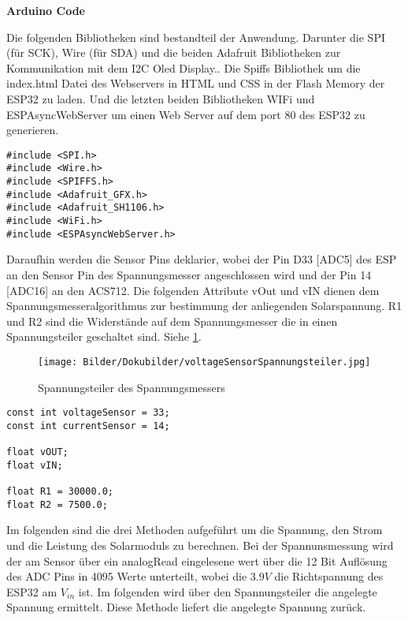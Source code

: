 \documentclass[ngerman]{mucproc}
\newenvironment{minted}[2][]{\endgraf\verbatim}{\endverbatim}
\begin{document}
\textbf{Arduino Code}

Die folgenden Bibliotheken sind bestandteil der Anwendung. Darunter die SPI (für SCK), Wire (für SDA) und die beiden Adafruit Bibliotheken zur Kommunikation mit dem I2C Oled Display.\parencites{SPI.2021}{Wire.2021}.
Die Spiffs Bibliothek um die index.html Datei des Webservers in HTML und CSS in der Flash Memory der ESP32 zu laden\parencites{SPIFFS.2021}. Und die letzten beiden Bibliotheken WIFi und ESPAsyncWebServer um einen Web Server auf dem port 80 des ESP32 zu generieren.

\begin{verbatim}
#include <SPI.h>
#include <Wire.h>
#include <SPIFFS.h>
#include <Adafruit_GFX.h>
#include <Adafruit_SH1106.h>
#include <WiFi.h>
#include <ESPAsyncWebServer.h>
\end{verbatim}

Daraufhin werden die Sensor Pins deklarier, wobei der Pin D33 [ADC5] des ESP an den Sensor Pin des Spannungsmesser angeschlossen wird und der Pin 14 [ADC16] an den ACS712. Die folgenden Attribute vOut und vIN dienen dem Spannungsmesseralgorithmus zur bestimmung der anliegenden Solarspannung. R1 und R2 sind die Widerstände auf dem Spannungsmesser die in einen Spannungsteiler geschaltet sind. Siehe \ref{fig:Spannungsteiler}.

		\begin{figure}
			\centering
			\texttt{[image: Bilder/Dokubilder/voltageSensorSpannungsteiler.jpg]}
			\caption{Spannungsteiler des Spannungsmessers}
			\label{fig:Spannungsteiler}
		\end{figure}

\begin{verbatim}
const int voltageSensor = 33;
const int currentSensor = 14;

float vOUT;
float vIN;

float R1 = 30000.0;
float R2 = 7500.0;

\end{verbatim}

Im folgenden sind die drei Methoden aufgeführt um die Spannung, den Strom und die Leistung des Solarmoduls zu berechnen. Bei der Spannunsmessung wird der am Sensor über ein analogRead eingelesene wert über die 12 Bit Auflösung des ADC Pins in 4095 Werte unterteilt, wobei die $3.9V$ die Richtspannung des ESP32 am $V_{in}$ ist. Im folgenden wird über den Spannungsteiler die angelegte Spannung ermittelt. Diese Methode liefert die angelegte Spannung zurück. 
\end{document}
